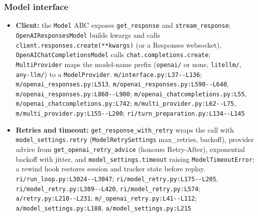 \subsubsection*{Model interface}
\begin{itemize}
\item \textbf{Client:} the \texttt{Model} ABC exposes \texttt{get\_\allowbreak{}response} and \texttt{stream\_\allowbreak{}response}; \texttt{OpenAIResponsesModel} builds kwargs and calls \texttt{client.\allowbreak{}responses.\allowbreak{}create(\allowbreak{}**kwargs)} (or a Responses websocket), \texttt{OpenAIChatCompletionsModel} calls \texttt{chat.\allowbreak{}completions.\allowbreak{}create}; \texttt{MultiProvider} maps the model-name prefix (\texttt{openai/\allowbreak{}} or none, \texttt{litellm/\allowbreak{}}, \texttt{any-\allowbreak{}llm/\allowbreak{}}) to a \texttt{ModelProvider}. \texttt{m/\allowbreak{}interface.\allowbreak{}py:\allowbreak{}L37-\allowbreak{}-\allowbreak{}L136}; \texttt{m/\allowbreak{}openai\_\allowbreak{}responses.\allowbreak{}py:\allowbreak{}L513}, \texttt{m/\allowbreak{}openai\_\allowbreak{}responses.\allowbreak{}py:\allowbreak{}L590-\allowbreak{}-\allowbreak{}L640}, \texttt{m/\allowbreak{}openai\_\allowbreak{}responses.\allowbreak{}py:\allowbreak{}L860-\allowbreak{}-\allowbreak{}L900}; \texttt{m/\allowbreak{}openai\_\allowbreak{}chatcompletions.\allowbreak{}py:\allowbreak{}L55}, \texttt{m/\allowbreak{}openai\_\allowbreak{}chatcompletions.\allowbreak{}py:\allowbreak{}L742}; \texttt{m/\allowbreak{}multi\_\allowbreak{}provider.\allowbreak{}py:\allowbreak{}L62-\allowbreak{}-\allowbreak{}L75}, \texttt{m/\allowbreak{}multi\_\allowbreak{}provider.\allowbreak{}py:\allowbreak{}L155-\allowbreak{}-\allowbreak{}L200}; \texttt{ri/\allowbreak{}turn\_\allowbreak{}preparation.\allowbreak{}py:\allowbreak{}L134-\allowbreak{}-\allowbreak{}L145}
\item \textbf{Retries and timeout:} \texttt{get\_\allowbreak{}response\_\allowbreak{}with\_\allowbreak{}retry} wraps the call with \texttt{model\_\allowbreak{}settings.\allowbreak{}retry} (\texttt{ModelRetrySettings} max\_retries, backoff), provider advice from \texttt{get\_\allowbreak{}openai\_\allowbreak{}retry\_\allowbreak{}advice} (honours Retry-After), exponential backoff with jitter, and \texttt{model\_\allowbreak{}settings.\allowbreak{}timeout} raising \texttt{ModelTimeoutError}; a rewind hook restores session and tracker state before replay. \texttt{ri/\allowbreak{}run\_\allowbreak{}loop.\allowbreak{}py:\allowbreak{}L3024-\allowbreak{}-\allowbreak{}L3047}; \texttt{ri/\allowbreak{}model\_\allowbreak{}retry.\allowbreak{}py:\allowbreak{}L175-\allowbreak{}-\allowbreak{}L205}, \texttt{ri/\allowbreak{}model\_\allowbreak{}retry.\allowbreak{}py:\allowbreak{}L389-\allowbreak{}-\allowbreak{}L420}, \texttt{ri/\allowbreak{}model\_\allowbreak{}retry.\allowbreak{}py:\allowbreak{}L574}; \texttt{a/\allowbreak{}retry.\allowbreak{}py:\allowbreak{}L210-\allowbreak{}-\allowbreak{}L231}; \texttt{m/\allowbreak{}\_\allowbreak{}openai\_\allowbreak{}retry.\allowbreak{}py:\allowbreak{}L41-\allowbreak{}-\allowbreak{}L112}; \texttt{a/\allowbreak{}model\_\allowbreak{}settings.\allowbreak{}py:\allowbreak{}L188}, \texttt{a/\allowbreak{}model\_\allowbreak{}settings.\allowbreak{}py:\allowbreak{}L215}

\end{itemize}
